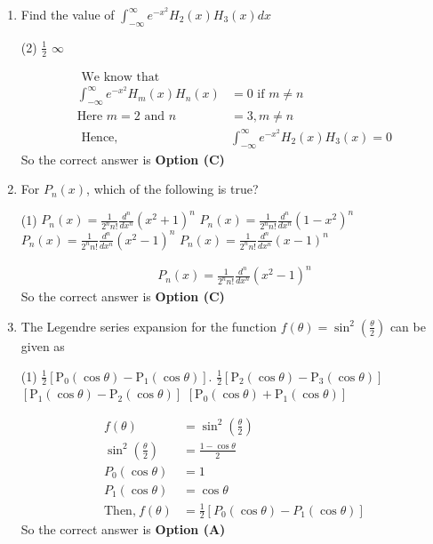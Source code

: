 \begin{enumerate}[label=\color{ocre}\textbf{\arabic*.}]
\item Find the value of $\int_{-\infty}^{\infty} e^{-x^{2}} H_{2}(x) H_{3}(x) d x$
\begin{tasks}(2)
	\task[\textbf{b.}]$\frac{1}{2} $
	\task[\textbf{d.}]$\infty$ 
\end{tasks}
\begin{answer}
	$$
	\begin{aligned}
\text{	We know that}&\\
	\int_{-\infty}^{\infty} e^{-x^{2}} H_{m}(x) H_{n}(x)&=0 \text { if } m \neq n\\
	\text{Here $m=2$ and }n&=3, m \neq n\\
\text{	Hence,}&
	\int_{-\infty}^{\infty} e^{-x^{2}} H_{2}(x) H_{3}(x)=0
	\end{aligned}
	$$
So the correct answer is \textbf{Option (C)}
\end{answer}
\item For $P_{n}(x)$, which of the following is true?
\begin{tasks}(1)
	\task[\textbf{A.}] $P_{n}(x)=\frac{1}{2^{n} n !} \frac{d^{n}}{d x^{n}}\left(x^{2}+1\right)^{n}$
	\task[\textbf{B.}] $P_{n}(x)=\frac{1}{2^{n} n !} \frac{d^{n}}{d x^{n}}\left(1-x^{2}\right)^{n}$
	\task[\textbf{C.}] $P_{n}(x)=\frac{1}{2^{n} n !} \frac{d^{n}}{d x^{n}}\left(x^{2}-1\right)^{n}$
	\task[\textbf{D.}] $P_{n}(x)=\frac{1}{2^{n} n !} \frac{d^{n}}{d x^{n}}(x-1)^{n}$
\end{tasks}
\begin{answer}
	$$\begin{aligned}
	P_{n}(x)=\frac{1}{2^{n} n !} \frac{d^{n}}{d x^{n}}\left(x^{2}-1\right)^{n}
	\end{aligned}$$
	So the correct answer is \textbf{Option (C)}
\end{answer}
\item The Legendre series expansion for the function $f(\theta)=\sin ^{2}\left(\frac{\theta}{2}\right)$ can be given as

\begin{tasks}(1)
	\task[\textbf{A.}] $\frac{1}{2}\left[\mathrm{P}_{0}(\cos \theta)-\mathrm{P}_{1}(\cos \theta)\right]$.
	\task[\textbf{B.}] $\frac{1}{2}\left[\mathrm{P}_{2}(\cos \theta)-\mathrm{P}_{3}(\cos \theta)\right]$
	\task[\textbf{C.}] $\left[\mathrm{P}_{1}(\cos \theta)-\mathrm{P}_{2}(\cos \theta)\right]$
	\task[\textbf{D.}] $\left[\mathrm{P}_{0}(\cos \theta)+\mathrm{P}_{1}(\cos \theta)\right]$
\end{tasks}
\begin{answer}
$$\begin{aligned}
	f(\theta)&=\sin ^{2}\left(\frac{\theta}{2}\right)\\
	\sin ^{2}\left(\frac{\theta}{2}\right)&=\frac{1-\cos \theta}{2}\\
	{P}_{0}(\cos \theta)&=1\\
	{P}_{1}(\cos \theta)&=\cos \theta\\
	\text{Then,}\  f(\theta)&=\frac{1}{2}\left[{P}_{0}(\cos \theta)-{P}_{1}(\cos \theta) \right] 
\end{aligned}$$
So the correct answer is \textbf{Option (A)}
\end{answer}


\end{enumerate}
